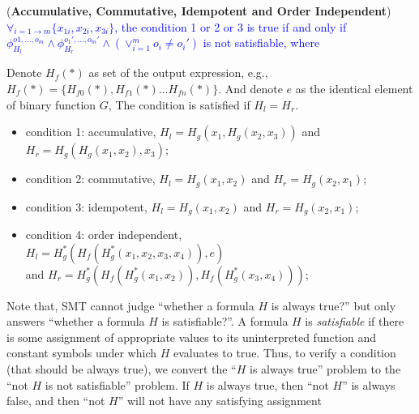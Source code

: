 \begin{definition}
	\label{coro:auto:1}
	(\textbf{Accumulative, Commutative, Idempotent and Order Independent})
	\textcolor{blue}{$\forall_{i=1\to m} \{x_{1i},x_{2i},x_{3i}\}$, the condition 1 or 2 or 3 is true if and only if $\phi_{H_l}^{o1,\ldots,o_m}\wedge \phi_{H_r}^{o_1',\ldots,o_m'}\wedge (\vee_{i=1}^m{o_i\neq o_i'})$ is not satisfiable, where}
	
	Denote $H_f(*)$ as set of the output expression, e.g., $H_f(*)=\{H_{f0}(*),H_{f1}(*)\ldots H_{fn}(*)\}$. And denote $e$ as the identical element of binary function $G$,
	The condition is satisfied  if $H_l=H_r$. 
	\begin{itemize}
		\item condition 1: accumulative, $H_l=H_g(x_1,H_g(x_2,x_3))$ and $H_r=H_g(H_g(x_1,x_2),x_3)$;
		\item condition 2: commutative, $H_l=H_g(x_1,x_2)$ and $H_r=H_g(x_2,x_1)$;
		\item condition 3: idempotent, $H_l=H_g(x_1,x_2)$ and $H_r=H_g(x_2,x_1)$;
		\item condition 4: order independent, \\		
		$H_l=H^*_g(H_f(H^*_g(x_1,x_2,x_3,x_4)),e)$\\		
		 and  $H_r=H^*_g(H_f(H^*_g(x_1,x_2)),H_f(H^*_g(x_3,x_4)))$;
	\end{itemize}
\end{definition}
{\color{green}
Note that, SMT cannot judge ``whether a formula $H$ is always true?'' but only answers ``whether a formula $H$ is satisfiable?''. A formula $H$ is \emph{satisfiable} if there is some assignment of appropriate values to its uninterpreted function and constant symbols under which $H$ evaluates to true. Thus, to verify a condition (that should be always true), we convert the ``$H$ is always true'' problem to the ``not $H$ is not satisfiable'' problem. If $H$ is always true, then ``not $H$'' is always false, and then ``not $H$'' will not have any satisfying assignment
}

